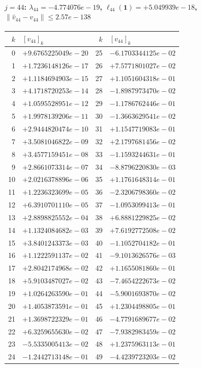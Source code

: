 \documentclass[11pt]{article}
\begin{document}
\paragraph{$j = 44$: $\lambda_{44} = -4.774076e-19$, \quad $\ell_{44}(\mathbf{1}) = +5.049939e-18$, \quad $\|\hat v_{44} - v_{44}\| \leq 2.57e-138$}
\begin{center}
{\footnotesize
\begin{tabular}{r@{\;\;}l@{\quad}r@{\;\;}l}
\toprule
$k$ & $[v_{44}]_k$ & $k$ & $[v_{44}]_k$ \\
\midrule
0 & $+9.6765225049e-20$ & 25 & $-6.1703344125e-02$ \\
1 & $+1.7236148126e-17$ & 26 & $+7.5771801027e-02$ \\
2 & $+1.1184694903e-15$ & 27 & $+1.1051604318e-01$ \\
3 & $+4.1718720253e-14$ & 28 & $-1.8987973470e-02$ \\
4 & $+1.0595528951e-12$ & 29 & $-1.1786762446e-01$ \\
5 & $+1.9978139206e-11$ & 30 & $-1.3663629541e-02$ \\
6 & $+2.9444820474e-10$ & 31 & $+1.1547719083e-01$ \\
7 & $+3.5081046822e-09$ & 32 & $+2.1797681456e-02$ \\
8 & $+3.4577159451e-08$ & 33 & $-1.1593244631e-01$ \\
9 & $+2.8661073314e-07$ & 34 & $-8.8796220830e-03$ \\
10 & $+2.0216378896e-06$ & 35 & $+1.1761648314e-01$ \\
11 & $+1.2236323699e-05$ & 36 & $-2.3206798360e-02$ \\
12 & $+6.3910701110e-05$ & 37 & $-1.0953099413e-01$ \\
13 & $+2.8898825552e-04$ & 38 & $+6.8881229825e-02$ \\
14 & $+1.1324084682e-03$ & 39 & $+7.6192772508e-02$ \\
15 & $+3.8401243373e-03$ & 40 & $-1.1052704182e-01$ \\
16 & $+1.1222591137e-02$ & 41 & $-9.1013626576e-03$ \\
17 & $+2.8042174968e-02$ & 42 & $+1.1655081860e-01$ \\
18 & $+5.9103487027e-02$ & 43 & $-7.4654222673e-02$ \\
19 & $+1.0264263590e-01$ & 44 & $-5.9001693870e-02$ \\
20 & $+1.4053873591e-01$ & 45 & $+1.2304498805e-01$ \\
21 & $+1.3698722329e-01$ & 46 & $-4.7791689677e-02$ \\
22 & $+6.3259655630e-02$ & 47 & $-7.9382983459e-02$ \\
23 & $-5.5335005413e-02$ & 48 & $+1.2375963113e-01$ \\
24 & $-1.2442713148e-01$ & 49 & $-4.4239723203e-02$ \\
\bottomrule
\end{tabular}
}
\end{center}
\end{document}
